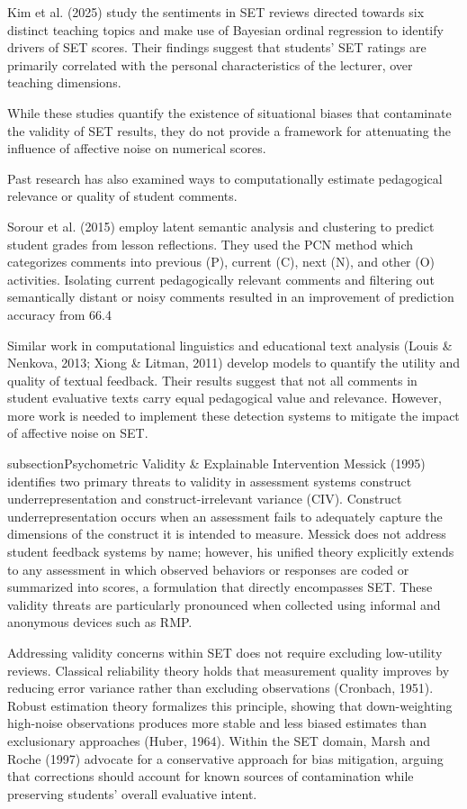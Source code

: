 Kim et al. (2025) study the sentiments in SET reviews directed towards six distinct teaching topics and make use of Bayesian ordinal regression to identify drivers of SET scores. Their findings suggest that students’ SET ratings are primarily correlated with the personal characteristics of the lecturer, over teaching dimensions.

While these studies quantify the existence of situational biases that contaminate the validity of SET results, they do not provide a framework for attenuating the influence of affective noise on numerical scores. 

Past research has also examined ways to computationally estimate pedagogical relevance or quality of student comments. 

Sorour et al. (2015) employ latent semantic analysis and clustering to predict student grades from lesson reflections. They used the PCN method which categorizes comments into previous (P), current (C), next (N), and other (O) activities. Isolating current pedagogically relevant comments and filtering out semantically distant or noisy comments resulted in an improvement of prediction accuracy from 66.4%

Similar work in computational linguistics and educational text analysis (Louis & Nenkova, 2013; Xiong & Litman, 2011) develop models to quantify the utility and quality of textual feedback. Their results suggest that not all comments in student evaluative texts carry equal pedagogical value and relevance. However, more work is needed to implement these detection systems to mitigate the impact of affective noise on SET.

subsection{Psychometric Validity & Explainable Intervention}
Messick (1995) identifies two primary threats to validity in assessment systems construct underrepresentation and construct-irrelevant variance (CIV). Construct underrepresentation occurs when an assessment fails to adequately capture the dimensions of the construct it is intended to measure. Messick does not address student feedback systems by name; however, his unified theory explicitly extends to any assessment in which observed behaviors or responses are coded or summarized into scores, a formulation that directly encompasses SET. These validity threats are particularly pronounced when collected using informal and anonymous devices such as RMP.

Addressing validity concerns within SET does not require excluding low-utility reviews. Classical reliability theory holds that measurement quality improves by reducing error variance rather than excluding observations (Cronbach, 1951). Robust estimation theory formalizes this principle, showing that down-weighting high-noise observations produces more stable and less biased estimates than exclusionary approaches (Huber, 1964). Within the SET domain, Marsh and Roche (1997) advocate for a conservative approach for bias mitigation, arguing that corrections should account for known sources of contamination while preserving students' overall evaluative intent.

